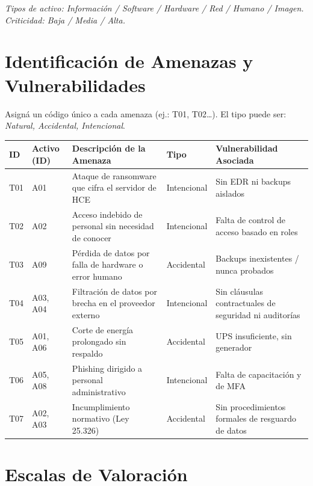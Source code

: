 \documentclass[11pt,a4paper]{article}
\begin{document}
\textit{Tipos de activo: Información / Software / Hardware / Red / Humano / Imagen. Criticidad: Baja / Media / Alta.}

\section{Identificación de Amenazas y Vulnerabilidades}

Asigná un código único a cada amenaza (ej.: T01, T02\ldots). El tipo puede ser: \textit{Natural, Accidental, Intencional}.

\begin{center}
\small
\renewcommand{\arraystretch}{1.6}
\begin{tabularx}{\textwidth}{@{} >{\centering\arraybackslash}p{1cm} >{\centering\arraybackslash}p{1.8cm} X >{\raggedright\arraybackslash}p{2.2cm} X @{}}
\toprule
\textbf{ID} & \textbf{Activo (ID)} & \textbf{Descripción de la Amenaza} & \textbf{Tipo} & \textbf{Vulnerabilidad Asociada} \\
\midrule
T01 & A01 & Ataque de ransomware que cifra el servidor de HCE & Intencional & Sin EDR ni backups aislados \\
T02 & A02 & Acceso indebido de personal sin necesidad de conocer & Intencional & Falta de control de acceso basado en roles \\
T03 & A09 & Pérdida de datos por falla de hardware o error humano & Accidental & Backups inexistentes / nunca probados \\
T04 & A03, A04 & Filtración de datos por brecha en el proveedor externo & Intencional & Sin cláusulas contractuales de seguridad ni auditorías \\
T05 & A01, A06 & Corte de energía prolongado sin respaldo & Accidental & UPS insuficiente, sin generador \\
T06 & A05, A08 & Phishing dirigido a personal administrativo & Intencional & Falta de capacitación y de MFA \\
T07 & A02, A03 & Incumplimiento normativo (Ley 25.326) & Accidental & Sin procedimientos formales de resguardo de datos \\
\bottomrule
\end{tabularx}
\end{center}

\section{Escalas de Valoración}\label{sec:escalas}
\end{document}
